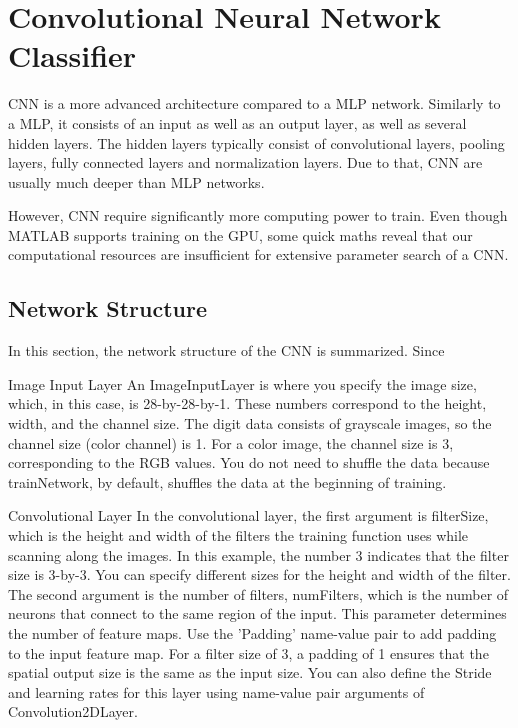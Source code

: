 \section{Convolutional Neural Network Classifier} \label{sec:CNN}
	\pagestyle{mario}

CNN is a more advanced architecture compared to a MLP network. Similarly to a MLP, it consists of an input as well as an output layer, as well as several hidden layers. The hidden layers typically consist of convolutional layers, pooling layers, fully connected layers and normalization layers. Due to that, CNN are usually much deeper than MLP networks.

However, CNN require significantly more computing power to train. Even though MATLAB supports training on the GPU, some quick maths reveal that our computational resources are insufficient for extensive parameter search of a CNN.

	
\subsection{Network Structure}

In this section, the network structure of the CNN is summarized. Since

Image Input Layer An ImageInputLayer is where you specify the image size, which, in this case, is 28-by-28-by-1. These numbers correspond to the height, width, and the channel size. The digit data consists of grayscale images, so the channel size (color channel) is 1. For a color image, the channel size is 3, corresponding to the RGB values. You do not need to shuffle the data because trainNetwork, by default, shuffles the data at the beginning of training.

Convolutional Layer In the convolutional layer, the first argument is filterSize, which is the height and width of the filters the training function uses while scanning along the images. In this example, the number 3 indicates that the filter size is 3-by-3. You can specify different sizes for the height and width of the filter. The second argument is the number of filters, numFilters, which is the number of neurons that connect to the same region of the input. This parameter determines the number of feature maps. Use the 'Padding' name-value pair to add padding to the input feature map. For a filter size of 3, a padding of 1 ensures that the spatial output size is the same as the input size. You can also define the Stride and learning rates for this layer using name-value pair arguments of Convolution2DLayer.

